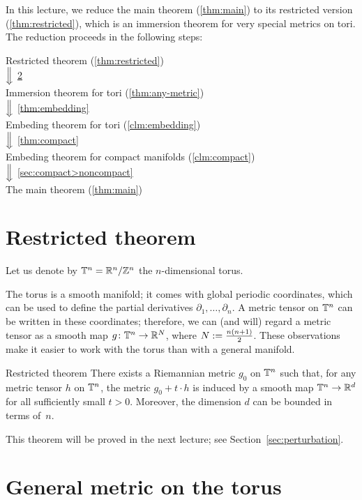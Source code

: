 In this lecture, we reduce the main theorem (\ref{thm:main}) to its restricted version (\ref{thm:restricted}),
which is an immersion theorem for very special metrics on tori.
The reduction proceeds in the following steps:

\begin{center}
Restricted theorem (\ref{thm:restricted}) \\
$\Big\Downarrow$ \ref{sec:any-metric}\\
Immersion theorem for tori (\ref{thm:any-metric})\\
$\Big\Downarrow$ \ref{thm:embedding}\\
Embeding theorem for tori (\ref{clm:embedding})\\
$\Big\Downarrow$ \ref{thm:compact}\\
Embeding theorem for compact manifolds (\ref{clm:compact})\\
$\Big\Downarrow$ \ref{sec:compact>noncompact}\\
The main theorem (\ref{thm:main})
\end{center}

\section{Restricted theorem}

Let us denote by $\mathbb{T}^n=\mathbb{R}^n/\mathbb{Z}^n$ the $n$-dimensional torus.

The torus is a smooth manifold;
it comes with global periodic coordinates, which can be used to define the partial derivatives $\partial_1, \dots, \partial_n$.
A metric tensor on $\mathbb{T}^n$ can be written in these coordinates;
therefore, we can (and will) regard a metric tensor as a smooth map $g\colon\mathbb{T}^n \to \mathbb{R}^N$,
where $N \mathrel{:=} \frac{n(n+1)}{2}$.
These observations make it easier to work with the torus than with a general manifold.

\begin{thm}{Restricted theorem}\label{thm:restricted}
There exists a Riemannian metric $g_0$ on $\mathbb{T}^n$ such that, for any metric tensor $h$ on $\mathbb{T}^n$,
the metric $g_0+t \cdot h$ is induced by a smooth map $\mathbb{T}^n\to \mathbb{R}^d$ for all sufficiently small $t > 0$.
Moreover, the dimension $d$ can be bounded in terms of~$n$.
\end{thm}

This theorem will be proved in the next lecture; see Section~\ref{sec:perturbation}.

\section{General metric on the torus}\label{sec:any-metric}

